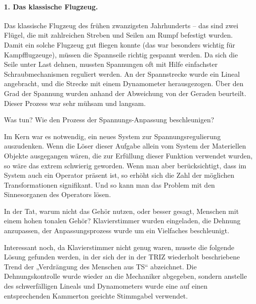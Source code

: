 \documentclass[11pt,a4paper]{article}
\begin{document}
\paragraph{1. Das klassische Flugzeug.}
Das klassische Flugzeug des frühen zwanzigsten Jahrhunderts -- das sind zwei
Flügel, die mit zahlreichen Streben und Seilen am Rumpf befestigt wurden.
Damit ein solche Flugzeug gut fliegen konnte (das war besonders wichtig für
Kampfflugzeuge), müssen die Spannseile richtig gespannt werden. Da sich die
Seile unter Last dehnen, mussten Spannungen oft mit Hilfe einfachster
Schraubmechanismen reguliert werden. An der Spannstrecke wurde ein Lineal
angebracht, und die Strecke mit einem Dynamometer herausgezogen. Über den Grad
der Spannung wurden anhand der Abweichung von der Geraden beurteilt. Dieser
Prozess war sehr mühsam und langsam.

Was tun? Wie den Prozess der Spannungs-Anpassung beschleunigen?

Im Kern war es notwendig, ein neues System zur Spannungsregulierung
auszudenken. Wenn die Löser dieser Aufgabe allein vom System der Materiellen
Objekte ausgegangen wären, die zur Erfüllung dieser Funktion verwendet wurden,
so wäre das extrem schwierig geworden.  Wenn man aber berücksichtigt, dass im
System auch ein Operator präsent ist, so erhöht sich die Zahl der möglichen
Transformationen signifikant. Und so kann man das Problem mit den
Sinnesorganen des Operators lösen.

In der Tat, warum nicht das Gehör nutzen, oder besser gesagt, Menschen mit
einem hohen tonalen Gehör? Klavierstimmer wurden eingeladen, die Dehnung
anzupassen, der Anpassungsprozess wurde um ein Vielfaches beschleunigt.

Interessant noch, da Klavierstimmer nicht genug waren, musste die folgende
Lösung gefunden werden, in der sich der in der TRIZ wiederholt beschriebene
Trend der „Verdrängung des Menschen aus TS“ abzeichnet. Die Dehnungskontrolle
wurde wieder an die Mechaniker abgegeben, sondern anstelle des schwerfälligen
Lineals und Dynamometers wurde eine auf einen entsprechenden Kammerton
geeichte Stimmgabel verwendet.
\end{document}
